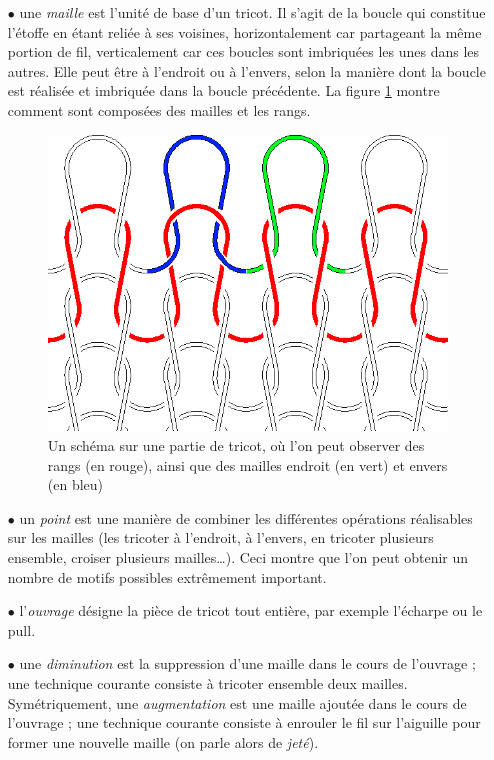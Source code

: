 \documentclass{article}
\begin{document}
\begin{itemize}
\item[$\bullet$] une \emph{maille} est l'unité de base d'un tricot. Il s'agit de
  la boucle qui constitue l'étoffe en étant reliée à ses voisines,
  horizontalement car partageant la même portion de fil, verticalement
  car ces boucles sont imbriquées les unes dans les autres. Elle peut
  être à l'endroit ou à l'envers, selon la manière dont la boucle est
  réalisée et imbriquée dans la boucle précédente. La figure \ref{maille} 
  montre comment sont composées des mailles et les rangs.

\begin{figure}[!ht]
  \centering \includegraphics[scale=0.25]{../presentation/Knit-schematic2.png}
  \caption{Un schéma sur une partie de tricot, où l'on peut observer des rangs 
  (en rouge), ainsi que des mailles endroit (en vert) et envers (en bleu)}
  \label{maille}
\end{figure}

\item[$\bullet$] un \emph{point} est une manière de combiner les différentes
  opérations réalisables sur les mailles (les tricoter à l'endroit, à
  l'envers, en tricoter plusieurs ensemble, croiser plusieurs mailles\dots).
  Ceci montre que l'on peut obtenir un nombre de motifs possibles 
  extrêmement important.
\item[$\bullet$] l'\emph{ouvrage} désigne la pièce de tricot tout entière, par
  exemple l'écharpe ou le pull.
\item[$\bullet$] une \emph{diminution} est la suppression d'une maille dans le
  cours de l'ouvrage ; une technique courante consiste à tricoter
  ensemble deux mailles. Symétriquement, une \emph{augmentation} est
  une maille ajoutée dans le cours de l'ouvrage ; une technique
  courante consiste à enrouler le fil sur l'aiguille pour former une
  nouvelle maille (on parle alors de \emph{jeté}).
\end{itemize}
\end{document}
